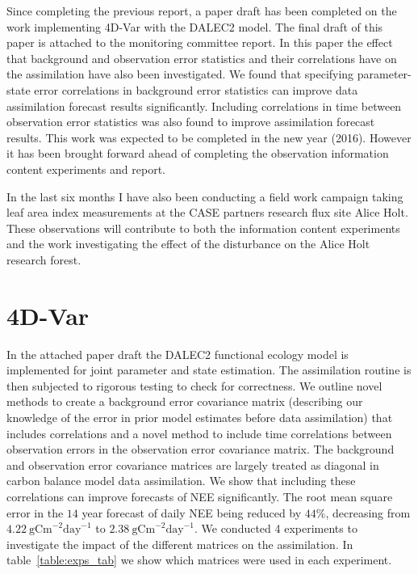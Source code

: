\documentclass[11pt]{article}
\begin{document}
Since completing the previous report, a paper draft has been completed on the work implementing 4D-Var with the DALEC2 model. The final draft of this paper is attached to the monitoring committee report. In this paper the effect that background and observation error statistics and their correlations have on the assimilation have also been investigated. We found that specifying parameter-state error correlations in background error statistics can improve data assimilation forecast results significantly. Including correlations in time between observation error statistics was also found to improve assimilation forecast results. This work was expected to be completed in the new year (2016). However it has been brought forward ahead of completing the observation information content experiments and report.

In the last six months I have also been conducting a field work campaign taking leaf area index measurements at the CASE partners research flux site Alice Holt. These observations will contribute to both the information content experiments and the work investigating the effect of the disturbance on the Alice Holt research forest.       

\section{4D-Var}

In the attached paper draft the DALEC2 functional ecology model is implemented for joint parameter and state estimation. The assimilation routine is then subjected to rigorous testing to check for correctness. We outline novel methods to create a background error covariance matrix (describing our knowledge of the error in prior model estimates before data assimilation) that includes correlations and a novel method to include time correlations between observation errors in the observation error covariance matrix. The background and observation error covariance matrices are largely treated as diagonal in carbon balance model data assimilation. We show that including these correlations can improve forecasts of NEE significantly. The root mean square error in the $14$ year forecast of daily NEE being reduced by $44\%$, decreasing from $4.22~\text{gCm}^{-2}\text{day}^{-1}$ to $2.38~\text{gCm}^{-2}\text{day}^{-1}$. We conducted 4 experiments to investigate the impact of the different matrices on the assimilation. In table~\ref{table:exps_tab} we show which matrices were used in each experiment. 
\end{document}
